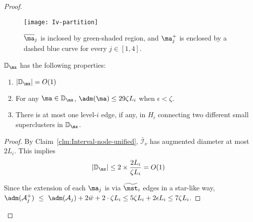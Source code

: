 \begin{proof}
\begin{wrapfigure}{r}{0.4\textwidth}
	\vspace{-35pt}
	\begin{center}
		\texttt{[image: Iv-partition]}
	\end{center}
	\caption{\footnotesize{$\overline{\ma}_j$ is inclosed by green-shaded region, and $\ma_j^+$ is enclosed by a dashed blue curve for every $j\in [1,4]$.}}
	\vspace{-10pt}
	\label{fig:Iv-partition}
\end{wrapfigure}
	\begin{claim}\label{clm:Size-DC}$\mathbb{D}_\mx$ has the following properties:
		\begin{enumerate}
			\item $|\mathbb{D}_\mx| = O(1)$
			\item For any $\ma \in\mathbb{D}_\mx$,  $\adm(\ma) \leq 29\zeta L_i$ when $\epsilon < \zeta$.
			\item  There is at most one level-$i$ edge, if any, in $H_i$ connecting two different small superclusters in $\mathbb{D}_\mx$.
		\end{enumerate}
	\end{claim}
	\begin{proof}
		By Claim~\ref{clm:Interval-node-unified}, $\bar{\mathcal{I}}_{\nu}$ has augmented diameter at most $2L_i$. This implies
		\begin{equation}
		|\mathbb{D}_\mx| \leq 2\times\frac{2L_i}{\zeta L_i} = O(1)
		\end{equation}
		
		Since the extension of each $\ma_j$ is via $\widetilde{\mst}_i$ edges in a star-like way, $\adm(\mathcal{A}_j^{+})~\leq~ \adm(\mathcal{A}_j) + 2\bar{w} + 2\cdot \zeta L_i \leq 5\zeta L_i + 2\epsilon L_i \leq 7\zeta L_i$.
		

\end{proof}
\end{proof}
